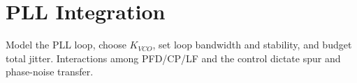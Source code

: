 \chapter{PLL Integration}
Model the PLL loop, choose \(K_{VCO}\), set loop bandwidth and stability, and budget total jitter. Interactions among PFD/CP/LF and the \VCO{} control dictate spur and phase-noise transfer.


